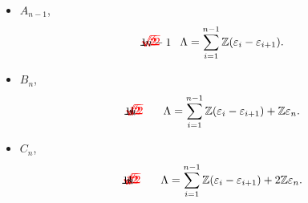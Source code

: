 \begin{itemize}
\item $A_{n-1}$,
\[
\begin{picture}(5,1)(-0.3,0.1)
\put(0,0.2){\circle*{0.2}}
\put(0,0.2){\line(1,0){1}}
\put(1,0.2){\circle*{0.2}}
\put(1,0.2){\line(1,0){1}}
\put(2,0.2){\circle*{0.2}}
\put(2,0.2){\line(1,0){0.1}}
\put(2.2,0.2){\line(1,0){0.1}}
\put(2.4,0.2){\line(1,0){0.1}}
\put(2.6,0.2){\line(1,0){0.1}}
\put(2.8,0.2){\line(1,0){0.1}}
\put(3,0.2){\circle*{0.2}}
\put(3,0.2){\line(1,0){1}}
\put(4,0.2){\circle*{0.2}}
\put(-0.3,0.4){\textcolor{red}{$\sqrt{2}$}}
\put(0.7,0.4){\textcolor{red}{$\sqrt{2}$}}
\put(3.7,0.4){\textcolor{red}{$\sqrt{2}$}}
\put(-0.1,-0.3){1}
\put(3.7,-0.3){$n-1$}
\end{picture}
    \quad \quad \quad
    \Lambda = \sum_{i=1}^{n-1} \Z (\varepsilon_i - \varepsilon_{i+1}).
\]

\item $B_n$,
\[
\begin{picture}(4.3,1)(-0.3,0.1)
\put(0,0.2){\circle*{0.2}}
\put(0,0.2){\line(1,0){1}}
\put(1,0.2){\circle*{0.2}}
\put(1,0.2){\line(1,0){1}}
\put(2,0.2){\circle*{0.2}}
\put(2,0.2){\line(1,0){0.1}}
\put(2.2,0.2){\line(1,0){0.1}}
\put(2.4,0.2){\line(1,0){0.1}}
\put(2.6,0.2){\line(1,0){0.1}}
\put(2.8,0.2){\line(1,0){0.1}}
\put(3,0.2){\circle*{0.2}}
\put(3,0.2){\line(1,0){1}}
\put(4,0.2){\circle*{0.2}}
\put(-0.3,0.4){\textcolor{red}{$\sqrt{2}$}}
\put(0.7,0.4){\textcolor{red}{$\sqrt{2}$}}
\put(2.7,0.4){\textcolor{red}{$\sqrt{2}$}}
\put(3.4,0.3){$4$}
\put(3.9,0.4){\textcolor{red}{$1$}}
\put(-0.1,-0.3){1}
\put(3.9,-0.3){$n$}
\end{picture}
\quad \quad \quad
    \Lambda = \sum_{i=1}^{n-1} \Z(\varepsilon_i - \varepsilon_{i+1})
    + \Z \varepsilon_n.
\]

\item $C_n$,
\[
\begin{picture}(4.3,1)(-0.3,0.1)
\put(0,0.2){\circle*{0.2}}
\put(0,0.2){\line(1,0){1}}
\put(1,0.2){\circle*{0.2}}
\put(1,0.2){\line(1,0){1}}
\put(2,0.2){\circle*{0.2}}
\put(2,0.2){\line(1,0){0.1}}
\put(2.2,0.2){\line(1,0){0.1}}
\put(2.4,0.2){\line(1,0){0.1}}
\put(2.6,0.2){\line(1,0){0.1}}
\put(2.8,0.2){\line(1,0){0.1}}
\put(3,0.2){\circle*{0.2}}
\put(3,0.2){\line(1,0){1}}
\put(4,0.2){\circle*{0.2}}
\put(-0.3,0.4){\textcolor{red}{$\sqrt{2}$}}
\put(0.7,0.4){\textcolor{red}{$\sqrt{2}$}}
\put(2.7,0.4){\textcolor{red}{$\sqrt{2}$}}
\put(3.4,0.3){$4$}
\put(3.9,0.4){\textcolor{red}{$2$}}
\put(-0.1,-0.3){1}
\put(3.9,-0.3){$n$}
\end{picture}
\quad \quad \quad
    \Lambda = \sum_{i=1}^{n-1} \Z(\varepsilon_i - \varepsilon_{i+1})
    + 2\Z \varepsilon_n.
\]
\end{itemize}

